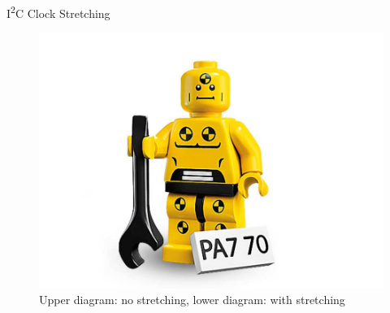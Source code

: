 \documentclass[]{beamer} %
\newcommand{\twi}{I\textsuperscript{2}C\xspace}
\newenvironment{changemargin}[2]
{
	\begin{list}{}
		{
			\setlength{\topsep}{0pt}
			\setlength{\leftmargin}{#1}
			\setlength{\rightmargin}{#2}
			\setlength{\listparindent}{\parindent}
		\setlength{\itemindent}{\parindent}
			\setlength{\parsep}{\parskip}
		}
	\item[]
	}
	{
	\end{list}
}
\begin{document}
\begin{frame}[fragile]{\twi Clock Stretching}
\begin{changemargin}{-0.5cm}{+1cm}
			\begin{figure}
				\includegraphics[width=\textwidth,height=0.8\textheight,keepaspectratio]{dummy}
				\caption{Upper diagram: no stretching, lower diagram: with stretching}
			\end{figure}
	\end{changemargin}
\end{frame}
\end{document}

